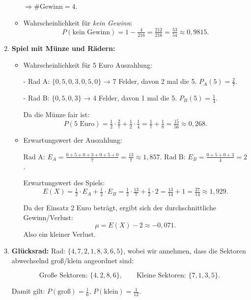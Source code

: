 \documentclass[11pt,a4paper,oneside]{article}
\begin{document}
\begin{loesung}
\begin{enumerate}
\begin{itemize}
				$\Rightarrow \#\text{Gewinn} = 4$.  
				
				\item Wahrscheinlichkeit für \emph{kein Gewinn}:  
				\[
				P(\text{kein Gewinn}) = 1 - \tfrac{4}{216} = \tfrac{212}{216} = \tfrac{53}{54} \approx 0{,}9815.
				\]
			\end{itemize}
			
			\item \textbf{Spiel mit Münze und Rädern:}  
			\begin{itemize}
				\item Wahrscheinlichkeit für 5 Euro Auszahlung:  
				
				- Rad A: $\{0,5,0,3,0,5,0\}$ → 7 Felder, davon 2 mal die 5.  
				$P_A(5) = \tfrac{2}{7}$.  
				
				- Rad B: $\{0,5,0,3\}$ → 4 Felder, davon 1 mal die 5.  
				$P_B(5) = \tfrac{1}{4}$.  
				
				Da die Münze fair ist:  
				\[
				P(\text{5 Euro}) = \tfrac{1}{2}\cdot\tfrac{2}{7} + \tfrac{1}{2}\cdot\tfrac{1}{4} = \tfrac{1}{7} + \tfrac{1}{8} = \tfrac{15}{56} \approx 0{,}268.
				\]
				
				\item Erwartungswert der Auszahlung:  
				
				Rad A: $E_A = \tfrac{0+5+0+3+0+5+0}{7} = \tfrac{13}{7} \approx 1{,}857$.  
				Rad B: $E_B = \tfrac{0+5+0+3}{4} = 2$.  
				
				Erwartungswert des Spiels:  
				\[
				E(X) = \tfrac{1}{2}\cdot E_A + \tfrac{1}{2}\cdot E_B = \tfrac{1}{2}\cdot\tfrac{13}{7} + \tfrac{1}{2}\cdot 2 = \tfrac{13}{14} + 1 = \tfrac{27}{14} \approx 1{,}929.
				\]
				
				Da der Einsatz 2 Euro beträgt, ergibt sich der durchschnittliche Gewinn/Verlust:  
				\[
				\mu = E(X) - 2 \approx -0{,}071.
				\]  
				Also ein kleiner Verlust.
			\end{itemize}
			
			\item \textbf{Glücksrad:}  
			Rad: $\{4,7,2,1,8,3,6,5\}$, wobei wir annehmen, dass die Sektoren abwechselnd groß/klein angeordnet sind:  
			
			\[
			\text{Große Sektoren: } \{4,2,8,6\}, \qquad \text{Kleine Sektoren: } \{7,1,3,5\}.
			\]
			
			Damit gilt: $P(\text{groß}) = \tfrac{1}{6}$, $P(\text{klein})=\tfrac{1}{12}$.  
			

\end{enumerate}
\end{loesung}
\end{document}
